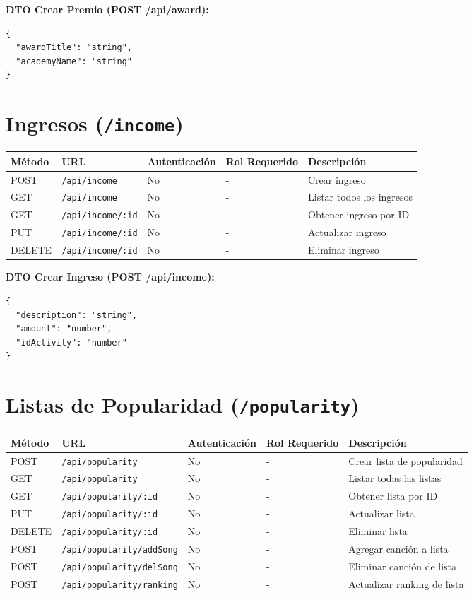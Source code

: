 \documentclass[11pt]{article}
\begin{document}
\textbf{DTO Crear Premio (POST /api/award):}
\begin{Verbatim}
{
  "awardTitle": "string",
  "academyName": "string"
}
\end{Verbatim}

\section{Ingresos (\texttt{/income})}

\begin{longtable}{lllll}
\toprule
\textbf{Método} & \textbf{URL} & \textbf{Autenticación} & \textbf{Rol Requerido} & \textbf{Descripción} \\
\midrule
\endhead
POST & \texttt{/api/income} & No & - & Crear ingreso \\
GET & \texttt{/api/income} & No & - & Listar todos los ingresos \\
GET & \texttt{/api/income/:id} & No & - & Obtener ingreso por ID \\
PUT & \texttt{/api/income/:id} & No & - & Actualizar ingreso \\
DELETE & \texttt{/api/income/:id} & No & - & Eliminar ingreso \\
\bottomrule
\end{longtable}

\textbf{DTO Crear Ingreso (POST /api/income):}
\begin{Verbatim}
{
  "description": "string",
  "amount": "number",
  "idActivity": "number"
}
\end{Verbatim}

\section{Listas de Popularidad (\texttt{/popularity})}

\begin{longtable}{lllll}
\toprule
\textbf{Método} & \textbf{URL} & \textbf{Autenticación} & \textbf{Rol Requerido} & \textbf{Descripción} \\
\midrule
\endhead
POST & \texttt{/api/popularity} & No & - & Crear lista de popularidad \\
GET & \texttt{/api/popularity} & No & - & Listar todas las listas \\
GET & \texttt{/api/popularity/:id} & No & - & Obtener lista por ID \\
PUT & \texttt{/api/popularity/:id} & No & - & Actualizar lista \\
DELETE & \texttt{/api/popularity/:id} & No & - & Eliminar lista \\
POST & \texttt{/api/popularity/addSong} & No & - & Agregar canción a lista \\
POST & \texttt{/api/popularity/delSong} & No & - & Eliminar canción de lista \\
POST & \texttt{/api/popularity/ranking} & No & - & Actualizar ranking de lista \\
\bottomrule
\end{longtable}
\end{document}
